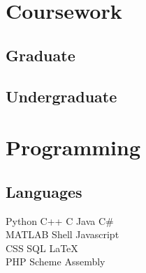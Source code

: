 \documentclass[]{_deedy-resume}
\begin{document}
\begin{minipage}[t]{0.33\textwidth}

\section{Coursework}
\subsection{Graduate}
\sectionsep

\subsection{Undergraduate}


\section{Programming}
\subsection{Languages}
Python \textbullet{} C++ \textbullet{} C \textbullet{} Java \textbullet{} C\# \\
MATLAB \textbullet{} Shell \textbullet{} Javascript \\
CSS \textbullet{} SQL \textbullet{} \LaTeX \\
PHP \textbullet{} Scheme \textbullet{} Assembly \\
\sectionsep


\end{minipage}
\end{document}
